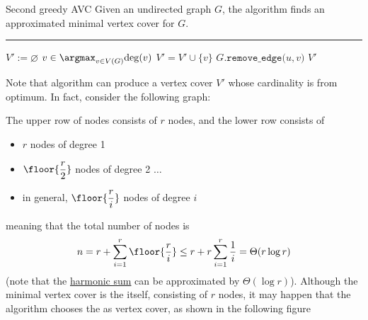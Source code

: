 \documentclass[a4paper, 12pt]{report}
\begin{document}
    \begin{framedalgo}{Second greedy AVC}
        Given an undirected graph $G$, the algorithm finds an approximated minimal vertex cover for $G$. \\
        \hrule

        \quad
        \label{alg:second_greedy_avc}
        \begin{algorithmic}[1]
                \State $V' := \varnothing$
                    \State $v \in \argmax_{v \in V(G)}{\deg(v)}$
                    \State $V' = V' \cup \{v\}$
                     
                        \State $G\texttt{.remove\_edge(}u, v\texttt{)}$
                    \EndFor
                \EndWhile
                \State {} $V'$
            \EndFunction
        \end{algorithmic}
    \end{framedalgo}



    Note that algorithm can produce a vertex cover $V'$ whose cardinality is  from optimum. In fact, consider the following graph: 

    The upper row of nodes consists of $r$ nodes, and the lower row consists of

    \begin{itemize}
        \item $r$ nodes of degree 1
        \item $\floor{\dfrac{r}{2}}$ nodes of degree 2 $\ldots$
        \item in general, $\floor{\dfrac{r}{i}}$ nodes of degree $i$
    \end{itemize}

    meaning that the total number of nodes is $$n = r + \sum_{i = 1}^r{\floor{\dfrac{r}{i}}} \le r + r \sum_{i = 1} ^r{\dfrac{1}{i}} = \Theta(r \log r)$$ (note that the \href{https://en.wikipedia.org/wiki/Harmonic_series_(mathematics)}{harmonic sum} can be approximated by $\Theta(\log r)$). Although the  minimal vertex cover is the  itself, consisting of $r$ nodes, it may happen that the algorithm chooses the  as vertex cover, as shown in the following figure 
\end{document}
